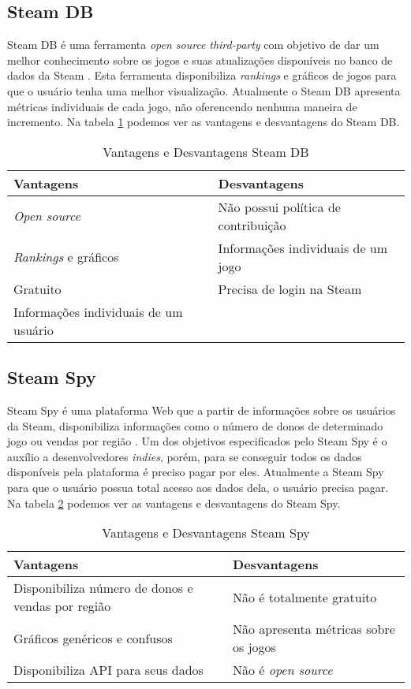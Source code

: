 \subsection{Steam DB}
Steam DB é uma ferramenta \textit{open source} \textit{third-party} com objetivo de dar um melhor conhecimento sobre os jogos e suas atualizações disponíveis no banco de dados da Steam \cite{steam_db}. Esta ferramenta disponibiliza \textit{rankings} e gráficos de jogos para que o usuário tenha uma melhor visualização. Atualmente o Steam DB apresenta métricas individuais de cada jogo, não oferencendo nenhuma maneira de incremento. Na tabela \ref{table:steam_db} podemos ver as vantagens e desvantagens do Steam DB.
\begin{table} [H]
\centering
\begin{tabular}{|p{7cm}|p{7cm}|}
\hline \textbf{Vantagens} & \textbf{Desvantagens} \\
\hline \textit{Open source} & Não possui política de contribuição \\
\hline \textit{Rankings} e gráficos & Informações individuais de um jogo \\
\hline Gratuito & Precisa de login na Steam \\
\hline Informações individuais de um usuário & \\
\hline
\end{tabular}
\caption{Vantagens e Desvantagens Steam DB}
\label{table:steam_db}
\end{table}
\subsection{Steam Spy}
Steam Spy é uma plataforma Web que a partir de informações sobre os usuários da Steam, disponibiliza informações como o número de donos de determinado jogo ou vendas por região \cite{steam_spy}. Um dos objetivos especificados pelo Steam Spy é o auxílio a desenvolvedores \textit{indies}, porém, para se conseguir todos os dados disponíveis pela plataforma é preciso pagar por eles. Atualmente a Steam Spy para que o usuário possua total acesso aos dados dela, o usuário precisa pagar. Na tabela \ref{table:steam_spy} podemos ver as vantagens e desvantagens do Steam Spy.
\begin{table} [H]
\centering
\begin{tabular}{|p{7cm}|p{7cm}|}
\hline \textbf{Vantagens} & \textbf{Desvantagens} \\
\hline Disponibiliza número de donos e vendas por região & Não é totalmente gratuito \\
\hline Gráficos genéricos e confusos & Não apresenta métricas sobre os jogos \\
\hline Disponibiliza API para seus dados & Não é \textit{open source} \\
\hline
\end{tabular}
\caption{Vantagens e Desvantagens Steam Spy}
\label{table:steam_spy}
\end{table}
